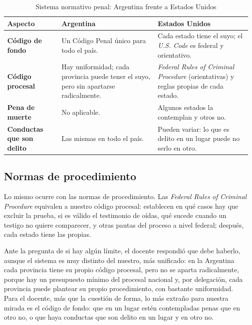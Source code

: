 \documentclass[12pt,oneside]{book}
\begin{document}
\begin{table}[H]
\centering
\small
\caption{Sistema normativo penal: Argentina frente a Estados Unidos}
\begin{tabularx}{\textwidth}{>{\raggedright\arraybackslash}p{} L L}
\toprule
\textbf{Aspecto} & \textbf{Argentina} & \textbf{Estados Unidos} \\
\midrule
\textbf{Código de fondo} & Un Código Penal único para todo el país. & Cada estado tiene el suyo; el \textit{U.S. Code} es federal y orientativo. \\
\addlinespace
\textbf{Código procesal} & Hay uniformidad; cada provincia puede tener el suyo, pero sin apartarse radicalmente. & \textit{Federal Rules of Criminal Procedure} (orientativas) y reglas propias de cada estado. \\
\addlinespace
\textbf{Pena de muerte} & No aplicable. & Algunos estados la contemplan y otros no. \\
\addlinespace
\textbf{Conductas que son delito} & Las mismas en todo el país. & Pueden variar: lo que es delito en un lugar puede no serlo en otro. \\
\bottomrule
\end{tabularx}
\end{table}

\subsection{Normas de procedimiento}

Lo mismo ocurre con las normas de procedimiento. Las \textit{Federal Rules of Criminal Procedure} equivalen a nuestro código procesal: establecen en qué casos hay que excluir la prueba, si es válido el testimonio de oídas, qué sucede cuando un testigo no quiere comparecer, y otras pautas del proceso a nivel federal; después, cada estado tiene las propias.

Ante la pregunta de si hay algún límite, el docente respondió que debe haberlo, aunque el sistema es muy distinto del nuestro, más unificado: en la Argentina cada provincia tiene su propio código procesal, pero no se aparta radicalmente, porque hay un presupuesto mínimo del procesal nacional y, por delegación, cada provincia puede plantear su propio procedimiento, con bastante uniformidad. Para el docente, más que la cuestión de forma, lo más extraño para nuestra mirada es el código de fondo: que en un lugar estén contempladas penas que en otro no, o que haya conductas que son delito en un lugar y en otro no.
\end{document}
